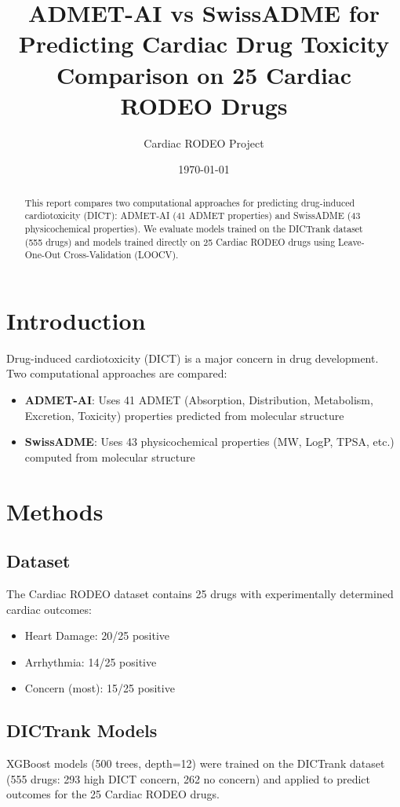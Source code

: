 \documentclass[11pt]{article}
\title{ADMET-AI vs SwissADME for Predicting Cardiac Drug Toxicity\\
\large Comparison on 25 Cardiac RODEO Drugs}
\author{Cardiac RODEO Project}
\date{\today}
\begin{document}
\maketitle

\begin{abstract}
This report compares two computational approaches for predicting drug-induced cardiotoxicity (DICT):
ADMET-AI (41 ADMET properties) and SwissADME (43 physicochemical properties).
We evaluate models trained on the DICTrank dataset (555 drugs) and models trained directly on 25 Cardiac RODEO drugs using Leave-One-Out Cross-Validation (LOOCV).
\end{abstract}

\section{Introduction}

Drug-induced cardiotoxicity (DICT) is a major concern in drug development. Two computational approaches are compared:

\begin{itemize}
    \item \textbf{ADMET-AI}: Uses 41 ADMET (Absorption, Distribution, Metabolism, Excretion, Toxicity) properties predicted from molecular structure
    \item \textbf{SwissADME}: Uses 43 physicochemical properties (MW, LogP, TPSA, etc.) computed from molecular structure
\end{itemize}

\section{Methods}

\subsection{Dataset}
The Cardiac RODEO dataset contains 25 drugs with experimentally determined cardiac outcomes:
\begin{itemize}
    \item Heart Damage: 20/25 positive
    \item Arrhythmia: 14/25 positive
    \item Concern (most): 15/25 positive
\end{itemize}

\subsection{DICTrank Models}
XGBoost models (500 trees, depth=12) were trained on the DICTrank dataset (555 drugs: 293 high DICT concern, 262 no concern) and applied to predict outcomes for the 25 Cardiac RODEO drugs.
\end{document}
